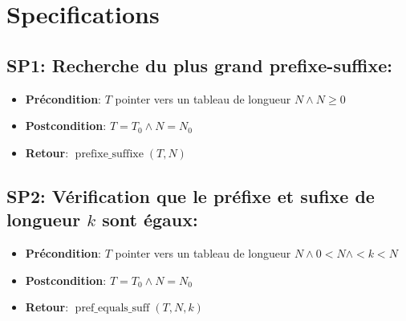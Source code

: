\section{Specifications}\label{specifications}



\subsection{SP1: Recherche du plus grand prefixe-suffixe:}
\begin{itemize}
    \item \textbf{Précondition}: $T$ pointer vers un tableau de longueur $N \land N \geq 0$
    \item \textbf{Postcondition}: $T = T_0 \land N = N_0$
    \item \textbf{Retour}: $ \operatorname{prefixe\_suffixe}(T, N) $
\end{itemize}



\subsection{SP2: Vérification que le préfixe et sufixe de longueur $k$ sont égaux:}
\begin{itemize}
    \item \textbf{Précondition}: $T$ pointer vers un tableau de longueur $N \land 0 < N \land < k < N$
    \item \textbf{Postcondition}: $T = T_0 \land N = N_0$
    \item \textbf{Retour}: $ \operatorname{pref\_equals\_suff}(T, N, k) $
\end{itemize}
